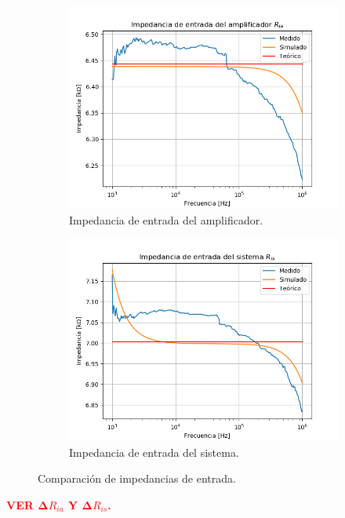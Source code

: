 \begin{figure}[H]
\centering
\begin{subfigure}{.49\textwidth}
\centering
	\includegraphics[width=\textwidth]{Imagenes/Ria.png}
	\caption{Impedancia de entrada del amplificador.}
\end{subfigure}
\begin{subfigure}{.49\textwidth}
\centering
	\includegraphics[width=\textwidth]{Imagenes/Ris.png}
	\caption{Impedancia de entrada del sistema.}
\end{subfigure}
\caption{Comparación de impedancias de entrada.}
\end{figure}

\begin{center}
	\Large{\textcolor{red}{\textbf{VER $\mathbf\Delta R_{ia}$ Y $\mathbf\Delta R_{is}$.}}}
\end{center}

